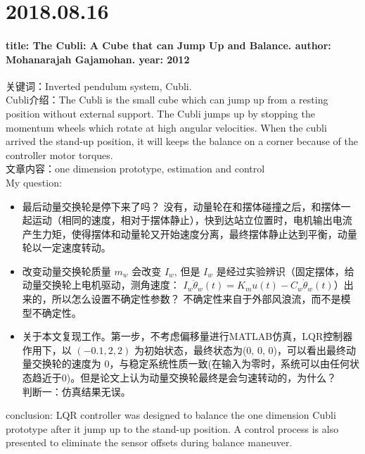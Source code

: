 \documentclass[UTF8,a4paper]{ctexart}
\begin{document}
\section{2018.08.16}
\paragraph{title: The Cubli: A Cube that can Jump Up and Balance. author: Mohanarajah Gajamohan. year: 2012}
关键词：Inverted pendulum system, Cubli.\\
Cubli介绍：The Cubli is the small cube which can jump up from a resting position without external support.
The Cubli jumps up by stopping the momentum wheels which rotate at high angular velocities.
When the cubli arrived the stand-up position, it will keeps the balance on a corner because of the controller motor torques.\\
文章内容：one dimension prototype, estimation and control \\
My question:
\begin{itemize}
\item 最后动量交换轮是停下来了吗？ 没有，动量轮在和摆体碰撞之后，和摆体一起运动（相同的速度，相对于摆体静止），快到达站立位置时，电机输出电流产生力矩，使得摆体和动量轮又开始速度分离，最终摆体静止达到平衡，动量轮以一定速度转动。
\item 改变动量交换轮质量 $m_w$ 会改变 $I_w$, 但是 $I_w$ 是经过实验辨识（固定摆体，给动量交换轮上电机驱动，测角速度： $I_{w} \ddot{\theta}_{w}(t)=K_{m} u(t)-C_{w} \dot{\theta}_{w}(t)$）出来的，所以怎么设置不确定性参数？ 不确定性来自于外部风浪流，而不是模型不确定性。
\item 关于本文复现工作。第一步，不考虑偏移量进行MATLAB仿真，LQR控制器作用下，以 $(-0.1, 2, 2)$ 为初始状态，最终状态为(0, 0, 0)，可以看出最终动量交换轮的速度为 $0$，与稳定系统性质一致(在输入为零时，系统可以由任何状态趋近于0)。但是论文上认为动量交换轮最终是会匀速转动的，为什么？\\
判断一：仿真结果无误。\\
\end{itemize}
conclusion: LQR controller was designed to balance the one dimension Cubli prototype after it jump up to the stand-up position. A control process is also presented to eliminate the sensor offsets during balance maneuver.
\end{document}
